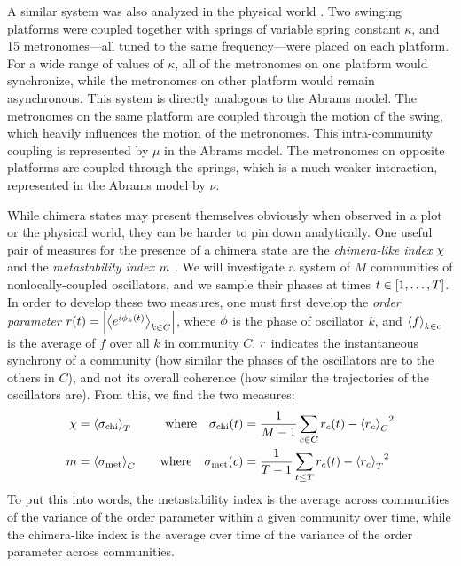 A similar system was also analyzed in the physical world \cite{Martens2013}.
Two swinging platforms were coupled together with springs of variable spring constant $\kappa$, and 15 metronomes---all tuned to the same frequency---were placed on each platform.
For a wide range of values of $\kappa$, all of the metronomes on one platform would synchronize, while the metronomes on other platform would remain asynchronous.
This system is directly analogous to the Abrams model.
The metronomes on the same platform are coupled through the motion of the swing, which heavily influences the motion of the metronomes.
This intra-community coupling is represented by $\mu$ in the Abrams model.
The metronomes on opposite platforms are coupled through the springs, which is a much weaker interaction, represented in the Abrams model by $\nu$.

While chimera states may present themselves obviously when observed in a plot or the physical world, they can be harder to pin down analytically.
One useful pair of measures for the presence of a chimera state are the \textit{chimera-like index} $\chi$ and the \textit{metastability index} $m$ \cite{Shanahan2010,Hizanidis2016}.
We will investigate a system of $M$ communities of nonlocally-coupled oscillators, and we sample their phases at times $t \in \bqty{1, \ldots, T}$.
In order to develop these two measures, one must first develop the \textit{order parameter} $r(t) = \abs{\expval{e^{i \phi_{k}(t)}}_{k \in C}}$, where $\phi$ is the phase of oscillator $k$, and $\ev{f}_{k \in c}$ is the average of $f$ over all $k$ in community $C$.
$r$ indicates the instantaneous synchrony of a community (how similar the phases of the oscillators are to the others in $C$), and not its overall coherence (how similar the trajectories of the oscillators are).
From this, we find the two measures:
\begin{align}
  \label{eq:chimera}
  \chimera
  &=
    \expval{\sigma_{\text{chi}}}_{T}
  &
    \qq{where}
    \sigma_{\text{chi}}(t)
  &=
    \frac{1}{M - 1} \sum_{c \in C}{\ordparam_{c}(t) - \expval{\ordparam_{c}}_{C}}^{2} \\
  \label{eq:metastability}
  \meta
  &=
    \expval{\sigma_{\text{met}}}_{C}
  &
    \qq{where}
    \sigma_{\text{met}}(c)
  &=
    \frac{1}{T - 1} \sum_{t \leq T}{\ordparam_{c}(t) - \expval{\ordparam_{c}}_{T}}^{2}
\end{align}
To put this into words, the metastability index is the average across communities of the variance of the order parameter within a given community over time, while the chimera-like index is the average over time of the variance of the order parameter across communities.

